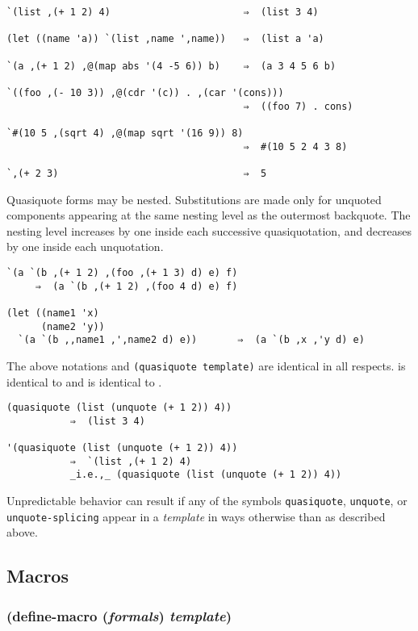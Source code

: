 \documentclass{article}
\begin{document}
\begin{verbatim}
`(list ,(+ 1 2) 4)                       ⇒  (list 3 4)

(let ((name 'a)) `(list ,name ',name))   ⇒  (list a 'a)

`(a ,(+ 1 2) ,@(map abs '(4 -5 6)) b)    ⇒  (a 3 4 5 6 b)

`((foo ,(- 10 3)) ,@(cdr '(c)) . ,(car '(cons)))
                                         ⇒  ((foo 7) . cons)

`#(10 5 ,(sqrt 4) ,@(map sqrt '(16 9)) 8)
                                         ⇒  #(10 5 2 4 3 8)

`,(+ 2 3)                                ⇒  5
\end{verbatim}

Quasiquote forms may be nested. Substitutions are made only for unquoted components appearing
at the same nesting level as the outermost backquote. The nesting level increases by one
inside each successive quasiquotation, and decreases by one inside each unquotation.

\begin{verbatim}
`(a `(b ,(+ 1 2) ,(foo ,(+ 1 3) d) e) f)
     ⇒  (a `(b ,(+ 1 2) ,(foo 4 d) e) f)

(let ((name1 'x)
      (name2 'y))
  `(a `(b ,,name1 ,',name2 d) e))       ⇒  (a `(b ,x ,'y d) e)
\end{verbatim}

The above notations and \verb|(quasiquote template)| are identical in all respects. is identical
to and is identical to .

\begin{verbatim}
(quasiquote (list (unquote (+ 1 2)) 4))
           ⇒  (list 3 4)

'(quasiquote (list (unquote (+ 1 2)) 4))
           ⇒  `(list ,(+ 1 2) 4)
           _i.e.,_ (quasiquote (list (unquote (+ 1 2)) 4))
\end{verbatim}

Unpredictable behavior can result if any of the symbols \verb|quasiquote|, \verb|unquote|,
or \verb|unquote-splicing| appear in a \emph{template} in ways otherwise than as described
above.

\subsection{Macros}\label{sec:macros}

\subsubsection{(define-macro (\emph{formals}) \emph{template})}
\end{document}
